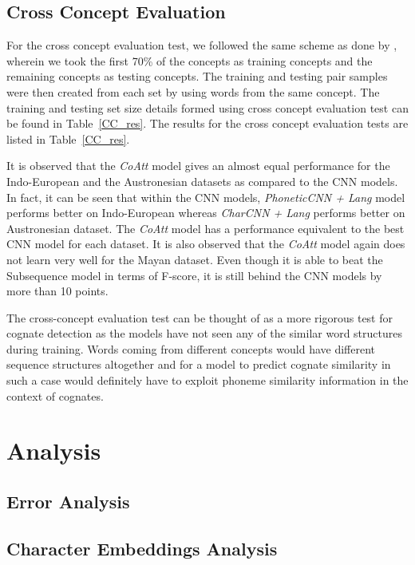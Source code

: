 \documentclass[11pt,letterpaper]{article}
\begin{document}
\subsection{Cross Concept Evaluation}

For the cross concept evaluation test, we followed the same scheme as done by \citet{rama2016siamese}, wherein we took the first 70\% of the concepts as training concepts and the remaining concepts as testing concepts. The training and testing pair samples were then created from each set by using words from the same concept. The training and testing set size details formed using cross concept evaluation test can be found in Table~\ref{CC_res}. The results for the cross concept evaluation tests are listed in Table~\ref{CC_res}.

It is observed that the \textit{CoAtt} model gives an almost equal performance for the Indo-European and the Austronesian datasets as compared to the CNN models. In fact, it can be seen that within the CNN models, \textit{PhoneticCNN + Lang} model performs better on Indo-European whereas \textit{CharCNN + Lang} performs better on Austronesian dataset. The \textit{CoAtt} model has a performance equivalent to the best CNN model for each dataset. It is also observed that the \textit{CoAtt} model again does not learn very well for the Mayan dataset. Even though it is able to beat the Subsequence model in terms of F-score, it is still behind the CNN models by more than 10 points.

The cross-concept evaluation test can be thought of as a more rigorous test for cognate detection as the models have not seen any of the similar word structures during training. Words coming from different concepts would have different sequence structures altogether and for a model to predict cognate similarity in such a case would definitely have to exploit phoneme similarity information in the context of cognates.

\section{Analysis}

\subsection{Error Analysis}

\subsection{Character Embeddings Analysis}
\end{document}

